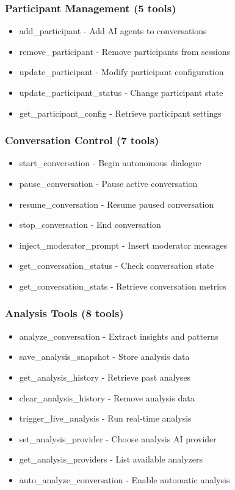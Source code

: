 \documentclass[11pt,letterpaper]{article}
\begin{document}
\subsubsection{Participant Management (5 tools)}
\begin{itemize}
    \item add\_participant - Add AI agents to conversations
    \item remove\_participant - Remove participants from sessions
    \item update\_participant - Modify participant configuration
    \item update\_participant\_status - Change participant state
    \item get\_participant\_config - Retrieve participant settings
\end{itemize}

\subsubsection{Conversation Control (7 tools)}
\begin{itemize}
    \item start\_conversation - Begin autonomous dialogue
    \item pause\_conversation - Pause active conversation
    \item resume\_conversation - Resume paused conversation
    \item stop\_conversation - End conversation
    \item inject\_moderator\_prompt - Insert moderator messages
    \item get\_conversation\_status - Check conversation state
    \item get\_conversation\_stats - Retrieve conversation metrics
\end{itemize}

\subsubsection{Analysis Tools (8 tools)}
\begin{itemize}
    \item analyze\_conversation - Extract insights and patterns
    \item save\_analysis\_snapshot - Store analysis data
    \item get\_analysis\_history - Retrieve past analyses
    \item clear\_analysis\_history - Remove analysis data
    \item trigger\_live\_analysis - Run real-time analysis
    \item set\_analysis\_provider - Choose analysis AI provider
    \item get\_analysis\_providers - List available analyzers
    \item auto\_analyze\_conversation - Enable automatic analysis
\end{itemize}
\end{document}
